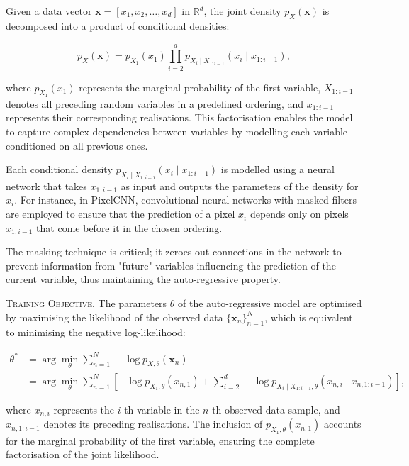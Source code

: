 Given a data vector \( \mathbf{x} = [x_1, x_2, \dots, x_d] \) in \( \mathbb{R}^d \), the joint density \( p_X(\mathbf{x}) \) is decomposed into a product of conditional densities:

\[
p_X(\mathbf{x}) = p_{X_1}(x_1) \prod_{i=2}^{d} p_{X_i \mid X_{1:i-1}}(x_i \mid x_{1:i-1}),
\]

\noindent where \( p_{X_1}(x_1) \) represents the marginal probability of the first variable, \( X_{1:i-1} \) denotes all preceding random variables in a predefined ordering, and \( x_{1:i-1} \) represents their corresponding realisations. This factorisation enables the model to capture complex dependencies between variables by modelling each variable conditioned on all previous ones.

Each conditional density \( p_{X_i \mid X_{1:i-1}}(x_i \mid x_{1:i-1}) \) is modelled using a neural network that takes \( x_{1:i-1} \) as input and outputs the parameters of the density for \( x_i \). For instance, in PixelCNN, convolutional neural networks with masked filters are employed to ensure that the prediction of a pixel \( x_i \) depends only on pixels \( x_{1:i-1} \) that come before it in the chosen ordering.

The masking technique is critical; it zeroes out connections in the network to prevent information from "future" variables influencing the prediction of the current variable, thus maintaining the auto-regressive property.

\textsc{Training Objective.} The parameters \( \theta \) of the auto-regressive model are optimised by maximising the likelihood of the observed data \( \{\mathbf{x}_n\}_{n=1}^N \), which is equivalent to minimising the negative log-likelihood:

\[
\begin{aligned}
\theta^* &= \arg \min_{\theta} \sum_{n=1}^{N} -\log p_{X,\theta}(\mathbf{x}_n) \\
         &= \arg \min_{\theta} \sum_{n=1}^{N} \left[ -\log p_{X_1,\theta}(x_{n,1}) 
         + \sum_{i=2}^{d} -\log p_{X_i \mid X_{1:i-1}, \theta}(x_{n,i} \mid x_{n,1:i-1}) \right],
\end{aligned}
\]

\noindent where \( x_{n,i} \) represents the \( i \)-th variable in the \( n \)-th observed data sample, and \( x_{n,1:i-1} \) denotes its preceding realisations. The inclusion of \( p_{X_1,\theta}(x_{n,1}) \) accounts for the marginal probability of the first variable, ensuring the complete factorisation of the joint likelihood.

